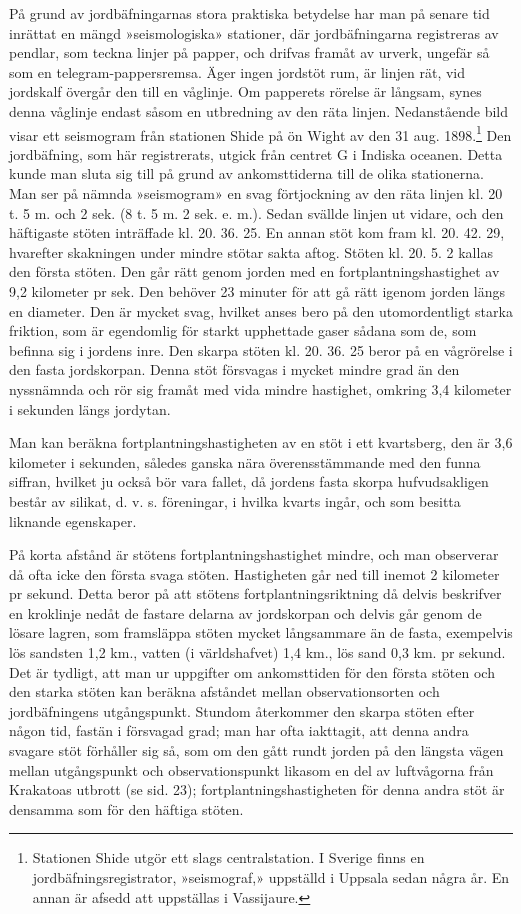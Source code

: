 \documentclass[a4paper, 12pt, oneside, swedish]{article}
\begin{document}
På grund av jordbäfningarnas stora praktiska betydelse har man på senare tid inrättat en mängd »seismologiska» stationer, där jordbäfningarna registreras av pendlar, som teckna linjer på papper, och drifvas framåt av urverk, ungefär så som en telegram-pappersremsa. Äger ingen jordstöt rum, är linjen rät, vid jordskalf övergår den till en våglinje. Om papperets rörelse är långsam, synes denna våglinje endast såsom en utbredning av den räta linjen. Nedanstående bild visar ett seismogram från stationen Shide på ön Wight av den 31 aug. 1898.\footnote{Stationen Shide utgör ett slags centralstation. I Sverige finns en jordbäfningsregistrator, »seismograf,» uppställd i Uppsala sedan några år. En annan är afsedd att uppställas i Vassijaure.} Den jordbäfning, som här registrerats, utgick från centret G i Indiska oceanen. Detta kunde man sluta sig till på grund av ankomsttiderna till de olika stationerna. Man ser på nämnda »seismogram» en svag förtjockning av den räta linjen kl. 20 t. 5 m. och 2 sek. (8 t. 5 m. 2 sek. e. m.). Sedan svällde linjen ut vidare, och den häftigaste stöten inträffade kl. 20. 36. 25. En annan stöt kom fram kl. 20. 42. 29, hvarefter skakningen under mindre stötar sakta aftog. Stöten kl. 20. 5. 2 kallas den första stöten. Den går rätt genom jorden med en fortplantningshastighet av 9,2 kilometer pr sek. Den behöver 23 minuter för att gå rätt igenom jorden längs en diameter. Den är mycket svag, hvilket anses bero på den utomordentligt starka friktion, som är egendomlig för starkt upphettade gaser sådana som de, som befinna sig i jordens inre. Den skarpa stöten kl. 20. 36. 25 beror på en vågrörelse i den fasta jordskorpan. Denna stöt försvagas i mycket mindre grad än den nyssnämnda och rör sig framåt med vida mindre hastighet, omkring 3,4 kilometer i sekunden längs jordytan.

Man kan beräkna fortplantningshastigheten av en stöt i ett kvartsberg, den är 3,6 kilometer i sekunden, således ganska nära överensstämmande med den funna siffran, hvilket ju också bör vara fallet, då jordens fasta skorpa hufvudsakligen består av silikat, d. v. s. föreningar, i hvilka kvarts ingår, och som besitta liknande egenskaper.

På korta afstånd är stötens fortplantningshastighet mindre, och man observerar då ofta icke den första svaga stöten. Hastigheten går ned till inemot 2 kilometer pr sekund. Detta beror på att stötens fortplantningsriktning då delvis beskrifver en kroklinje nedåt de fastare delarna av jordskorpan och delvis går genom de lösare lagren, som framsläppa stöten mycket långsammare än de fasta, exempelvis lös sandsten 1,2 km., vatten (i världshafvet) 1,4 km., lös sand 0,3 km. pr sekund. Det är tydligt, att man ur uppgifter om ankomsttiden för den första stöten och den starka stöten kan beräkna afståndet mellan observationsorten och jordbäfningens utgångspunkt. Stundom återkommer den skarpa stöten efter någon tid, fastän i försvagad grad; man har ofta iakttagit, att denna andra svagare stöt förhåller sig så, som om den gått rundt jorden på den längsta vägen mellan utgångspunkt och observationspunkt likasom en del av luftvågorna från Krakatoas utbrott (se sid. 23); fortplantningshastigheten för denna andra stöt är densamma som för den häftiga stöten.
\end{document}
